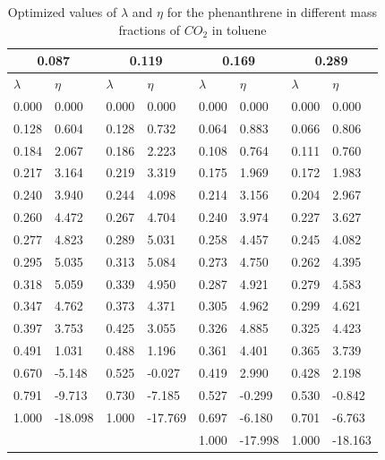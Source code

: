 \documentclass[
	12pt,				%
	openright,			%
	oneside,			%
	a4paper,			%
	english,			%
	brazil				%
	]{abntex2}
\begin{document}
\begin{apendicesenv}
\begin{table}[h]
	\centering
	\caption{Optimized values of $\lambda$ and $\eta$ for the phenanthrene in different mass fractions of $CO_{2}$ in toluene }
	\begin{tabular}{llllllll}
		\hline
		\multicolumn{2}{c}{0.087}& \multicolumn{2}{c}{0.119}& \multicolumn{2}{c}{0.169}& \multicolumn{2}{c}{0.289}\\
		\hline
		$\lambda$ & $\eta$ & $\lambda$ & $\eta$  & $\lambda$ & $\eta$  & $\lambda$ & $\eta$ \\ 
		\hline
0.000	&	0.000	&	0.000	&	0.000	&	0.000	&	0.000	&	0.000	&	0.000	\\
0.128	&	0.604	&	0.128	&	0.732	&	0.064	&	0.883	&	0.066	&	0.806	\\
0.184	&	2.067	&	0.186	&	2.223	&	0.108	&	0.764	&	0.111	&	0.760	\\
0.217	&	3.164	&	0.219	&	3.319	&	0.175	&	1.969	&	0.172	&	1.983	\\
0.240	&	3.940	&	0.244	&	4.098	&	0.214	&	3.156	&	0.204	&	2.967	\\
0.260	&	4.472	&	0.267	&	4.704	&	0.240	&	3.974	&	0.227	&	3.627	\\
0.277	&	4.823	&	0.289	&	5.031	&	0.258	&	4.457	&	0.245	&	4.082	\\
0.295	&	5.035	&	0.313	&	5.084	&	0.273	&	4.750	&	0.262	&	4.395	\\
0.318	&	5.059	&	0.339	&	4.950	&	0.287	&	4.921	&	0.279	&	4.583	\\
0.347	&	4.762	&	0.373	&	4.371	&	0.305	&	4.962	&	0.299	&	4.621	\\
0.397	&	3.753	&	0.425	&	3.055	&	0.326	&	4.885	&	0.325	&	4.423	\\
0.491	&	1.031	&	0.488	&	1.196	&	0.361	&	4.401	&	0.365	&	3.739	\\
0.670	&	-5.148	&	0.525	&	-0.027	&	0.419	&	2.990	&	0.428	&	2.198	\\
0.791	&	-9.713	&	0.730	&	-7.185	&	0.527	&	-0.299	&	0.530	&	-0.842	\\
1.000	&	-18.098	&	1.000	&	-17.769	&	0.697	&	-6.180	&	0.701	&	-6.763	\\
&		&		&		&	1.000	&	-17.998	&	1.000	&	-18.163	\\
		\hline
	\end{tabular}
\end{table}


\end{apendicesenv}
\end{document}
